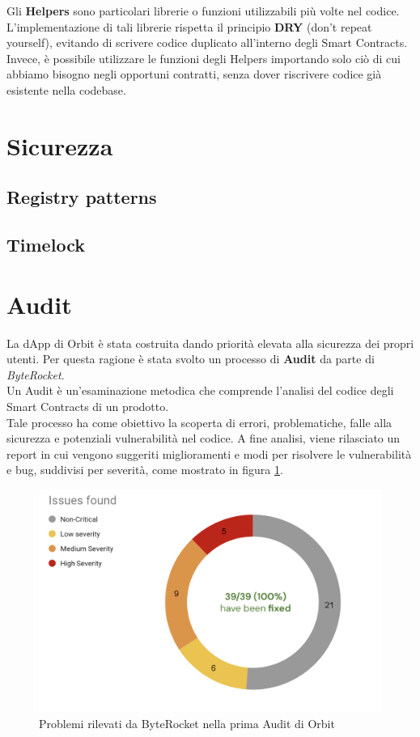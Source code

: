 \documentclass[12pt,a4paper]{report}
\begin{document}
Gli \textbf{Helpers} sono particolari librerie o funzioni utilizzabili più volte nel codice.
L'implementazione di tali librerie rispetta il principio \textbf{DRY} (don't repeat yourself), evitando di scrivere codice duplicato all'interno degli Smart Contracts.
\\Invece, è possibile utilizzare le funzioni degli Helpers importando solo ciò di cui abbiamo bisogno negli opportuni contratti, senza dover riscrivere codice già esistente nella codebase.

\section{Sicurezza}

\subsection{Registry patterns} \label{registry}

\subsection{Timelock}

\section{Audit}

La dApp di Orbit è stata costruita dando priorità elevata alla sicurezza dei propri utenti. Per questa ragione è stata svolto un processo di \textbf{Audit}\cite{audit} da parte di \textit{ByteRocket}.
\\Un Audit è un'esaminazione metodica che comprende l'analisi del codice degli Smart Contracts di un prodotto. \\Tale processo ha come obiettivo la scoperta di errori, problematiche, falle alla sicurezza e potenziali vulnerabilità nel codice. A fine analisi, viene rilasciato un report in cui vengono suggeriti miglioramenti e modi per risolvere le vulnerabilità e bug, suddivisi per severità, come mostrato in figura \ref{fig:audit}. 

\begin{figure}[H]
  \includegraphics[scale=0.40]{audit.png}
  \centering
  \caption{Problemi rilevati da ByteRocket nella prima Audit di Orbit}
  \label{fig:audit}
\end{figure}
\end{document}
